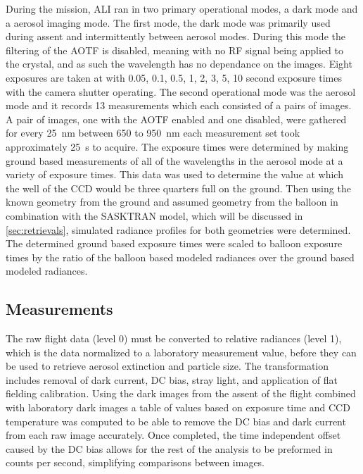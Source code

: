 \documentclass[12pt]{article}
\begin{document}
During the mission, ALI ran in two primary operational modes, a dark mode and a aerosol imaging mode. The first mode, the dark mode was primarily used during assent and intermittently between aerosol modes. During this mode the filtering of the AOTF is disabled, meaning with no RF signal being applied to the crystal, and as such the wavelength has no dependance on the images. Eight exposures are taken at with 0.05, 0.1, 0.5, 1, 2, 3, 5, 10 second exposure times with the camera shutter operating. The second operational mode was the aerosol mode and it records 13 measurements which each consisted of a pairs of images. A pair of images, one with the AOTF enabled and one disabled, were gathered for every 25~nm between 650 to 950~nm each measurement set took approximately 25~s to acquire. The exposure times were determined by making ground based measurements of all of the wavelengths in the aerosol mode at a variety of exposure times. This data was used to determine the value at which the well of the CCD would be three quarters full on the ground. Then using the known geometry from the ground and assumed geometry from the balloon in combination with the SASKTRAN model, which will be discussed in \autoref{sec:retrievals}, simulated radiance profiles for both geometries were determined. The determined ground based exposure times were scaled to balloon exposure times by the ratio of the balloon based modeled radiances over the ground based modeled radiances. %

\subsection{Measurements}

The raw flight data (level 0) must be converted to relative radiances (level 1), which is the data normalized to a laboratory measurement value, before they can be used to retrieve aerosol extinction and particle size. The transformation includes removal of dark current, DC bias, stray light, and application of flat fielding calibration. Using the dark images from the assent of the flight combined with laboratory dark images a table of values based on exposure time and CCD temperature was computed to be able to remove the DC bias and dark current from each raw image accurately. Once completed, the time independent offset caused by the DC bias allows for the rest of the analysis to be preformed in counts per second, simplifying comparisons between images. %
\end{document}
